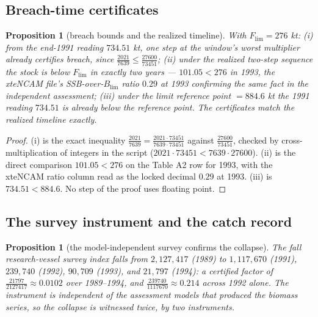 \documentclass[10pt,twocolumn]{article}
\theoremstyle{plain}
\newtheorem{proposition}[theorem]{Proposition}
\theoremstyle{remark}
\begin{document}
\subsection{Breach-time certificates}\label{breach}

\begin{proposition}[breach bounds and the realized timeline]
\label{prop:breach}
With \(F_{\mathrm{lim}} = 276\) kt: (i) from the end-1991 reading
\(734.51\) kt, one step at the window's worst multiplier already
certifies breach, since
\(\tfrac{2021}{7639} \le \tfrac{27600}{73451}\); (ii) under the
realized two-step sequence the stock is below \(F_{\mathrm{lim}}\) in
exactly two years --- \(101.05 < 276\) in 1993, the xteNCAM file's
SSB-over-\(B_{\mathrm{lim}}\) ratio \(0.29\) at 1993 confirming the
same fact in the independent assessment; (iii) under the limit
reference point \(= 884.6\) kt the 1991 reading \(734.51\) is already
below the reference point. The certificates match the realized timeline
exactly.
\end{proposition}

\begin{proof}
(i) is the exact inequality
\(\tfrac{2021}{7639} = \tfrac{2021 \cdot 73451}{7639 \cdot 73451}\)
against \(\tfrac{27600}{73451}\), checked by cross-multiplication of
integers in the script (\(2021 \cdot 73451 < 7639 \cdot 27600\)). (ii)
is the direct comparison \(101.05 < 276\) on the Table A2 row for 1993,
with the xteNCAM ratio column read as the locked decimal \(0.29\) at
1993. (iii) is \(734.51 < 884.6\). No step of the proof uses floating
point.
\end{proof}

\subsection{The survey instrument and the catch record}\label{survey}

\begin{proposition}[the model-independent survey confirms the
collapse]\label{prop:survey}
The fall research-vessel survey index falls from \(2{,}127{,}417\)
(1989) to \(1{,}117{,}670\) (1991), \(239{,}740\) (1992), \(90{,}709\)
(1993), and \(21{,}797\) (1994): a certified factor of
\(\tfrac{21797}{2127417} \approx 0.0102\) over 1989--1994, and
\(\tfrac{239740}{1117670} \approx 0.214\) across 1992 alone. The
instrument is independent of the assessment models that produced the
biomass series, so the collapse is witnessed twice, by two
instruments.
\end{proposition}
\end{document}
